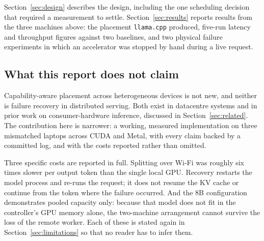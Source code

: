 Section~\ref{sec:design} describes the design, including the one scheduling
decision that required a measurement to settle. Section~\ref{sec:results}
reports results from the three machines above: the placement
\texttt{llama.cpp} produced, five-run latency and throughput figures against
two baselines, and two physical failure experiments in which an accelerator was
stopped by hand during a live request.

\subsection{What this report does not claim}

Capability-aware placement across heterogeneous devices is not new, and neither
is failure recovery in distributed serving. Both exist in datacentre systems and
in prior work on consumer-hardware inference, discussed in
Section~\ref{sec:related}. The contribution here is narrower: a working,
measured implementation on three mismatched laptops across CUDA and Metal, with
every claim backed by a committed log, and with the costs reported rather than
omitted.

Three specific costs are reported in full. Splitting over Wi-Fi was roughly six
times slower per output token than the single local GPU. Recovery restarts the
model process and re-runs the request; it does not resume the KV cache or
continue from the token where the failure occurred. And the 8B configuration
demonstrates pooled capacity only: because that model does not fit in the
controller's GPU memory alone, the two-machine arrangement cannot survive the
loss of the remote worker. Each of these is stated again in
Section~\ref{sec:limitations} so that no reader has to infer them.
